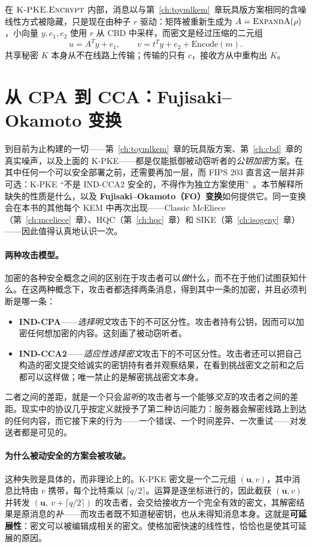 在 $\textsc{K-PKE.Encrypt}$ 内部，消息以与第~\ref{ch:toymlkem}~章玩具版方案相同的含噪线性方式被隐藏，只是现在由种子 $r$ 驱动：矩阵被重新生成为 $A=\textsc{ExpandA}(\rho)$，小向量 $y,e_1,e_2$ 使用 $r$ 从 CBD 中采样，而密文是经过压缩的二元组
\[
u = A^{T} y + e_1, \qquad v = t^{T} y + e_2 + \mathrm{Encode}(m).
\]
共享秘密 $K$ 本身从不在线路上传输；传输的只有 $c$，接收方从中重构出 $K$。

\section{从 CPA 到 CCA：Fujisaki--Okamoto 变换}
\label{sec:fo}

到目前为止构建的一切——第~\ref{ch:toymlkem}~章的玩具版方案、第~\ref{ch:cbd}~章的真实噪声，以及上面的 K-PKE——都是仅能抵御被动窃听者的\emph{公钥加密}方案。在其中任何一个可以安全部署之前，还需要再加一层，而 FIPS 203 直言这一层并非可选：K-PKE “不是 IND-CCA2 安全的，不得作为独立方案使用”~\cite{fips203}。本节解释所缺失的性质是什么，以及 \textbf{Fujisaki--Okamoto（FO）变换}如何提供它。同一变换会在本书的其他每个 KEM 中再次出现——Classic McEliece（第~\ref{ch:mceliece}~章）、HQC（第~\ref{ch:hqc}~章）和 SIKE（第~\ref{ch:isogeny}~章）——因此值得认真地认识一次。

\paragraph{两种攻击模型。}
加密的各种安全概念之间的区别在于攻击者可以\emph{做}什么，而不在于他们试图获知什么。在这两种概念下，攻击者都选择两条消息，得到其中一条的加密，并且必须判断是哪一条：

\begin{itemize}
  \item \textbf{IND-CPA}——\emph{选择明文}攻击下的不可区分性。攻击者持有公钥，因而可以加密任何想加密的内容。这刻画了被动窃听者。
  \item \textbf{IND-CCA2}——\emph{适应性选择密文}攻击下的不可区分性。攻击者还可以把自己构造的密文提交给诚实的密钥持有者并观察结果，在看到挑战密文之前和之后都可以这样做；唯一禁止的是解密挑战密文本身。
\end{itemize}

二者之间的差距，就是一个只会\emph{监听}的攻击者与一个能够\emph{交互}的攻击者之间的差距。现实中的协议几乎按定义就授予了第二种访问能力：服务器会解密线路上到达的任何内容，而它接下来的行为——一个错误、一个时间差异、一次重试——对发送者都是可见的。

\paragraph{为什么被动安全的方案会被攻破。}
这种失败是具体的，而非理论上的。K-PKE 密文是一个二元组 $(\mathbf{u}, v)$，其中消息比特由 $v$ 携带，每个比特乘以 $\lceil q/2 \rceil$。运算是逐坐标进行的，因此截获 $(\mathbf{u}, v)$ 并转发 $(\mathbf{u},\ v + \lceil q/2 \rceil)$ 的攻击者，会交给接收方一个完全有效的密文，其解密结果是原消息的\emph{补}——而攻击者既不知道秘密钥，也从未得知消息本身。这就是\textbf{可延展性}：密文可以被编辑成相关的密文。使格加密快速的线性性，恰恰也是使其可延展的原因。

